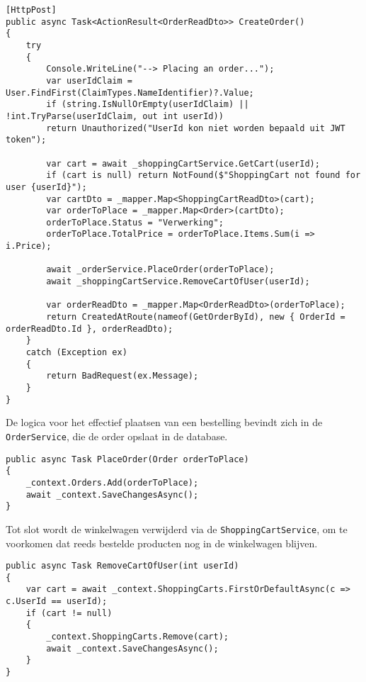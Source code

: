 \begin{lstlisting}[style=mystyleA, caption=OrdersController.cs (fragment), label=lst:MonoOrdersController]
[HttpPost]
public async Task<ActionResult<OrderReadDto>> CreateOrder()
{
	try
	{
		Console.WriteLine("--> Placing an order...");
		var userIdClaim = User.FindFirst(ClaimTypes.NameIdentifier)?.Value;
		if (string.IsNullOrEmpty(userIdClaim) || !int.TryParse(userIdClaim, out int userId))
		return Unauthorized("UserId kon niet worden bepaald uit JWT token");
		
		var cart = await _shoppingCartService.GetCart(userId);
		if (cart is null) return NotFound($"ShoppingCart not found for user {userId}");
		var cartDto = _mapper.Map<ShoppingCartReadDto>(cart);
		var orderToPlace = _mapper.Map<Order>(cartDto);
		orderToPlace.Status = "Verwerking";
		orderToPlace.TotalPrice = orderToPlace.Items.Sum(i => i.Price);
		
		await _orderService.PlaceOrder(orderToPlace);
		await _shoppingCartService.RemoveCartOfUser(userId);
		
		var orderReadDto = _mapper.Map<OrderReadDto>(orderToPlace);
		return CreatedAtRoute(nameof(GetOrderById), new { OrderId = orderReadDto.Id }, orderReadDto);
	}
	catch (Exception ex)
	{
		return BadRequest(ex.Message);
	}
}
\end{lstlisting}

\medskip
De logica voor het effectief plaatsen van een bestelling bevindt zich in de \texttt{OrderService}, die de order opslaat in de database.
\medskip

\begin{lstlisting}[style=mystyleA, caption=OrderService.cs (fragment), label=lst:MonoOrderService]
public async Task PlaceOrder(Order orderToPlace)
{
	_context.Orders.Add(orderToPlace);
	await _context.SaveChangesAsync();
}
\end{lstlisting}

\medskip
Tot slot wordt de winkelwagen verwijderd via de \texttt{ShoppingCartService}, om te voorkomen dat reeds bestelde producten nog in de winkelwagen blijven.
\medskip

\begin{lstlisting}[style=mystyleA, caption=RemoveCartOfUser in ShoppingCartService.cs, label=lst:MonoRemoveCart]
public async Task RemoveCartOfUser(int userId)
{
	var cart = await _context.ShoppingCarts.FirstOrDefaultAsync(c => c.UserId == userId);
	if (cart != null)
	{
		_context.ShoppingCarts.Remove(cart);
		await _context.SaveChangesAsync();
	}
}
\end{lstlisting}

